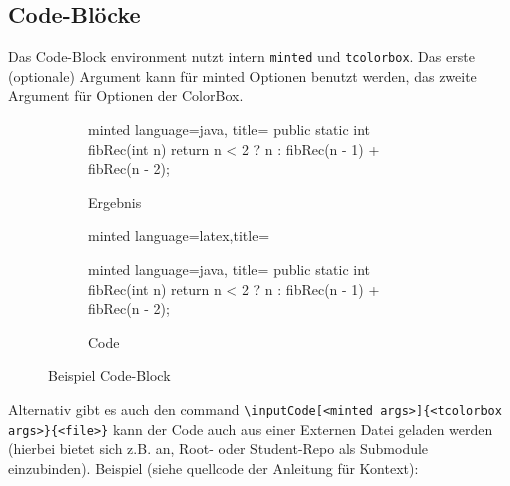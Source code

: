 \documentclass[
    titleprefix=AlgoTeX,
    inlineshortcut=java,
    corporatedesign,
    boxarc,
]{algoexercise}
\begin{document}
    \subsection{Code-Blöcke}
    Das Code-Block environment nutzt intern \verb+minted+ und \verb+tcolorbox+.
    Das erste (optionale) Argument kann für minted Optionen benutzt werden, das zweite Argument für Optionen der ColorBox.
    \begin{figure}[ht!]
        \centering
        \begin{subfigure}[t]{\textwidth}
            \centering
            \begin{codeBlock}[]{minted language=java, title=}
                    public static int fibRec(int n) {
                        return n < 2 ? n : fibRec(n - 1) + fibRec(n - 2);
                    }
                \end{codeBlock}
            \caption{Ergebnis}
            \label{fig:code-block-example:result}
        \end{subfigure}
        \begin{subfigure}[t]{\textwidth}
            \centering
            \begin{codeBlock}[]{minted language=latex,title=}
                    \begin{@codeBlock@}[]{minted language=java, title=}
                        public static int fibRec(int n) {
                            return n < 2 ? n : fibRec(n - 1) + fibRec(n - 2);
                        }
                    \end{@codeBlock@}
                \end{codeBlock}
            \caption{Code}
            \label{fig:code-block-example:code}
        \end{subfigure}
        \label{fig:code-block-example}
        \caption{Beispiel Code-Block}
    \end{figure}

    Alternativ gibt es auch den command \verb+\inputCode[<minted args>]{<tcolorbox args>}{<file>}+ kann der Code auch aus einer Externen Datei geladen werden (hierbei bietet sich z.B. an, Root- oder Student-Repo als Submodule einzubinden). Beispiel (siehe quellcode der Anleitung für Kontext):
\end{document}
